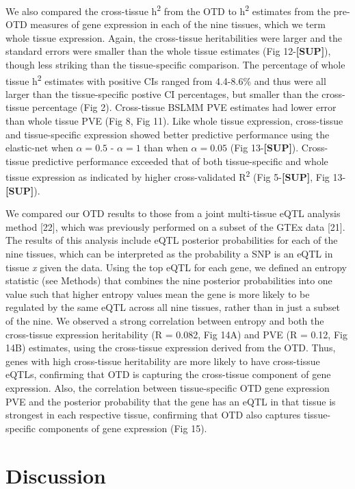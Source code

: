 \documentclass[]{article}
\begin{document}
We also compared the cross-tissue h\textsuperscript{2} from the OTD to
h\textsuperscript{2} estimates from the pre-OTD measures of gene
expression in each of the nine tissues, which we term whole tissue
expression. Again, the cross-tissue heritabilities were larger and the
standard errors were smaller than the whole tissue estimates (Fig
12-\textbf{{[}SUP{]}}), though less striking than the tissue-specific
comparison. The percentage of whole tissue h\textsuperscript{2}
estimates with positive CIs ranged from 4.4-8.6\% and thus were all
larger than the tissue-specific postive CI percentages, but smaller than
the cross-tissue percentage (Fig 2). Cross-tissue BSLMM PVE estimates
had lower error than whole tissue PVE (Fig 8, Fig 11). Like whole tissue
expression, cross-tissue and tissue-specific expression showed better
predictive performance using the elastic-net when \(\alpha=0.5\) -
\(\alpha=1\) than when \(\alpha=0.05\) (Fig 13-\textbf{{[}SUP{]}}).
Cross-tissue predictive performance exceeded that of both
tissue-specific and whole tissue expression as indicated by higher
cross-validated R\textsuperscript{2} (Fig 5-\textbf{{[}SUP{]}}, Fig
13-\textbf{{[}SUP{]}}).

We compared our OTD results to those from a joint multi-tissue eQTL
analysis method {[}22{]}, which was previously performed on a subset of
the GTEx data {[}21{]}. The results of this analysis include eQTL
posterior probabilities for each of the nine tissues, which can be
interpreted as the probability a SNP is an eQTL in tissue \emph{x} given
the data. Using the top eQTL for each gene, we defined an entropy
statistic (see Methods) that combines the nine posterior probabilities
into one value such that higher entropy values mean the gene is more
likely to be regulated by the same eQTL across all nine tissues, rather
than in just a subset of the nine. We observed a strong correlation
between entropy and both the cross-tissue expression heritability (R =
0.082, Fig 14A) and PVE (R = 0.12, Fig 14B) estimates, using the
cross-tissue expression derived from the OTD. Thus, genes with high
cross-tissue heritability are more likely to have cross-tissue eQTLs,
confirming that OTD is capturing the cross-tissue component of gene
expression. Also, the correlation between tissue-specific OTD gene
expression PVE and the posterior probability that the gene has an eQTL
in that tissue is strongest in each respective tissue, confirming that
OTD also captures tissue-specific components of gene expression (Fig
15).

\section{Discussion}\label{discussion}
\end{document}
